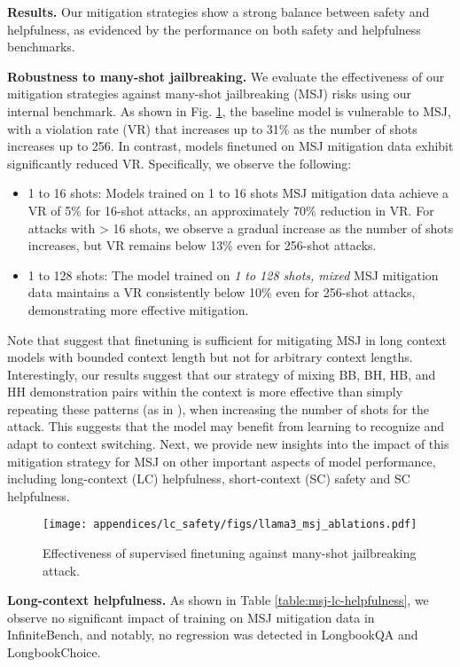 \textbf{Results.} Our mitigation strategies show a strong balance between safety and helpfulness, as evidenced by the performance on both safety and helpfulness benchmarks.

\textbf{Robustness to many-shot jailbreaking.}
We evaluate the effectiveness of our mitigation strategies against many-shot jailbreaking (MSJ) risks using our internal benchmark. As shown in Fig. \ref{fig:msj_ablation_results}, the baseline model is vulnerable to MSJ, with a violation rate (VR) that increases up to 31\% as the number of shots increases up to 256. In contrast, models finetuned on MSJ mitigation data exhibit significantly reduced VR.
Specifically, we observe the following:
\begin{itemize}
    \item 1 to 16 shots: Models trained on 1 to 16 shots MSJ mitigation data achieve a VR of 5\% for 16-shot attacks, an approximately 70\% reduction in VR. For attacks with > 16 shots, we observe a gradual increase as the number of shots increases, but VR remains below 13\% even for 256-shot attacks. 
    \item 1 to 128 shots: The model trained on \textit{1 to 128 shots, mixed} MSJ mitigation data maintains a VR consistently below 10\% even for 256-shot attacks, demonstrating more effective mitigation.
\end{itemize}
Note that \cite{anil2024many} suggest that finetuning is sufficient for mitigating MSJ in long context models with bounded context length but not for arbitrary context lengths.
Interestingly, our results suggest that our strategy of mixing BB, BH, HB, and HH demonstration pairs within the context is more effective than simply repeating these patterns (as in \cite{anil2024many}), when increasing the number of shots for the attack. This suggests that the model may benefit from learning to recognize and adapt to context switching. Next, we provide new insights into the impact of this mitigation strategy for MSJ on other important aspects of model performance, including long-context (LC) helpfulness, short-context (SC) safety and SC helpfulness.

\begin{figure}
    \centering
    \texttt{[image: appendices/lc\_safety/figs/llama3\_msj\_ablations.pdf]}
    \caption{Effectiveness of supervised finetuning against many-shot jailbreaking attack.}
    \label{fig:msj_ablation_results}
\end{figure}

\textbf{Long-context helpfulness.}
As shown in Table \ref{table:msj-lc-helpfulness}, we observe no significant impact of training on MSJ mitigation data in InfiniteBench, and notably, no regression was detected in LongbookQA and LongbookChoice.

